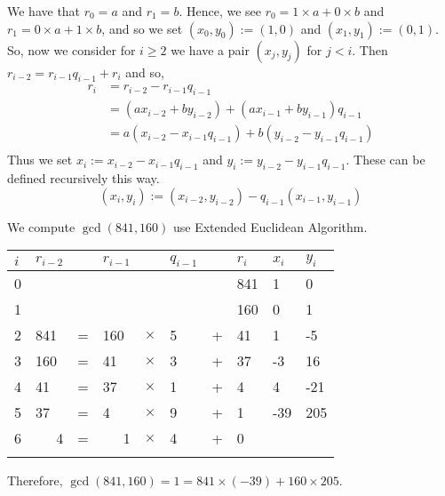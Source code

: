 We have that $r_0 = a$ and $r_1 = b$. Hence, we see $r_0 = 1 \times a + 0 \times b$ and $r_1 = 0 \times a + 1 \times b$, and so we set $(x_0, y_0) := (1, 0)$ and $(x_1, y_1) := (0, 1)$. So, now we consider for $i \ge 2$ we have a pair $(x_j, y_j)$ for $j < i$. Then $r_{i-2} = r_{i-1}q_{i-1} + r_i$ and so,
\begin{align*}
  r_i &= r_{i-2} - r_{i-1}q_{i-1}\\
  &= (ax_{i-2} + by_{i-2}) + (ax_{i-1} + by_{i-1})q_{i-1}\\
  &= a(x_{i-2} - x_{i-1}q_{i-1}) + b(y_{i-2} - y_{i-1}q_{i-1})\\
\end{align*}
Thus we set $x_i := x_{i-2} - x_{i-1}q_{i-1}$ and $y_i := y_{i-2} - y_{i-1}q_{i-1}$. These can be defined recursively this way.
$$ (x_i, y_i) := (x_{i-2}, y_{i-2}) - q_{i-1}(x_{i-1}, y_{i-1}) $$

\begin{eg}
  We compute $\gcd(841, 160)$ use Extended Euclidean Algorithm.
\begin{table}[!ht]
\centering
\begin{tabular}{llllllllll}
$i$ & $r_{i-2}$            &   & $r_{i-1}$            &          & $q_{i-1}$ &   & $r_i$ & $x_i$ & $y_i$ \\ \hline
0 &                       &   &                       &          &            &   & 841  & 1    & 0    \\
1 &                       &   &                       &          &            &   & 160  & 0    & 1    \\
2 & 841                   & = & 160                   & $\times$ & 5          & + & 41   & 1    & -5   \\
3 & 160                   & = & 41                    & $\times$ & 3          & + & 37   & -3   & 16   \\
4 & 41                    & = & 37                    & $\times$ & 1          & + & 4    & 4    & -21  \\
5 & 37                    & = & 4                     & $\times$ & 9          & + & 1    & -39  & 205  \\
6 & \multicolumn{1}{r}{4} & = & \multicolumn{1}{r}{1} & $\times$ & 4          & + & 0    &      &      \\
  & \multicolumn{1}{r}{}  &   &                       &          &            &   &      &      &
\end{tabular}%
\end{table}

Therefore, $\gcd(841, 160) = 1 = 841 \times (-39) + 160 \times 205$.
\end{eg}
